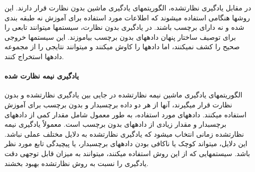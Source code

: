 در مقابل  یادگیری نظارت\nf شده، الگوریتم\nf های یادگیری ماشین بدون نظارت قرار دارند. این روش\nf ها هنگامی استفاده می\nf شوند که اطلاعات مورد استفاده برای آموزش نه طبقه بندی شده و نه دارای برچسب باشند. در یادگیری بدون نظارت، سیستم\nf ها می\nf توانند تابعی را برای توصیف ساختار پنهان داده\nf های بدون برچسب بیاموزند. این سیستم\nf ها خروجی صحیح را کشف نمی\nf کنند، اما داده\nf ها را کاوش می\nf کنند و می\nf توانند نتایجی را از مجموعه داده\nf ها استخراج کنند.


\paragraph{یادگیری نیمه نظارت شده}

الگوریتم\nf های یادگیری ماشین نیمه نظارت\nf شده در جایی بین یادگیری نظارت\nf شده و بدون نظارت قرار می\nf گیرند، آن\nf ها از هر دو داده برچسب\nf دار و بدون برچسب برای آموزش استفاده می\nf کنند. داده\nf های مورد استفاده، به طور معمول شامل مقدار کمی از داده\nf های برچسب\nf دار و مقدار زیادی از داده\nf های بدون برچسب است. معمولاً یادگیری نیمه نظارت\nf شده زمانی انتخاب می\nf شود که یادگیری نظارت\nf شده به دلایل مختلف عملی نباشد. این دلایل، می\nf تواند کوچک یا ناکافی بودن داده\nf های برچسب\nf دار، یا پیچیدگی تابع مورد نظر باشد. سیستم\nf هایی که از این روش استفاده می\nf کنند، می\nf توانند به میزان قابل توجهی دقت یادگیری را نسبت به روش نظارت\nf شده بهبود بخشند. 


